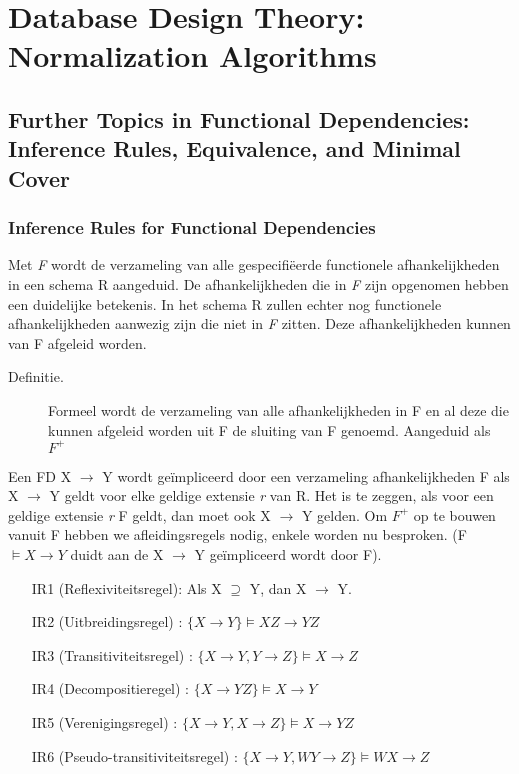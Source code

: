 \chapter{Database Design Theory: Normalization Algorithms}

	\section{Further Topics in Functional Dependencies: Inference Rules, Equivalence, and Minimal Cover}
		
		\subsection{Inference Rules for Functional Dependencies}
		
			Met \textit{F} wordt de verzameling van alle gespecifi\"eerde functionele afhankelijkheden in een schema R aangeduid. De afhankelijkheden die in \textit{F} zijn opgenomen hebben 				een duidelijke betekenis. In het schema R zullen echter nog functionele afhankelijkheden aanwezig zijn die niet in \textit{F} zitten. Deze afhankelijkheden kunnen van F afgeleid 				worden. 
			
			\begin{description}
				\item[Definitie. ] Formeel wordt de verzameling van alle afhankelijkheden in F en al deze die kunnen afgeleid worden uit F de sluiting van F genoemd. Aangeduid als $F^+$
			\end{description}
			
			Een FD X $\rightarrow$ Y wordt ge\"impliceerd door een verzameling afhankelijkheden F als X $\rightarrow$ Y geldt voor elke geldige extensie \textit{r} van R. Het is te zeggen, 				als voor een geldige extensie \textit{r} F geldt, dan moet ook X $\rightarrow$ Y gelden. Om $F^+$ op te bouwen vanuit F hebben we afleidingsregels nodig, enkele worden nu besproken. 				(F $\models X \rightarrow Y$ duidt aan de X $\rightarrow$ Y ge\"impliceerd wordt door F).
			
			\begin{itemize}
				\item[IR1] (Reflexiviteitsregel): Als X $ \supseteq$ Y, dan X $\rightarrow$ Y.
				\item[IR2] (Uitbreidingsregel) : $\lbrace X \rightarrow Y \rbrace \models XZ \rightarrow YZ$
				\item[IR3] (Transitiviteitsregel) : $\lbrace X \rightarrow Y, Y \rightarrow Z \rbrace \models X \rightarrow Z$
				\item[IR4] (Decompositieregel) : $\lbrace X \rightarrow YZ \rbrace \models X \rightarrow Y$
				\item[IR5] (Verenigingsregel) : $\lbrace X \rightarrow Y, X \rightarrow Z \rbrace \models X \rightarrow YZ$
				\item[IR6] (Pseudo-transitiviteitsregel) : $\lbrace X \rightarrow Y, WY \rightarrow Z \rbrace \models WX \rightarrow Z$
			\end{itemize}
			
